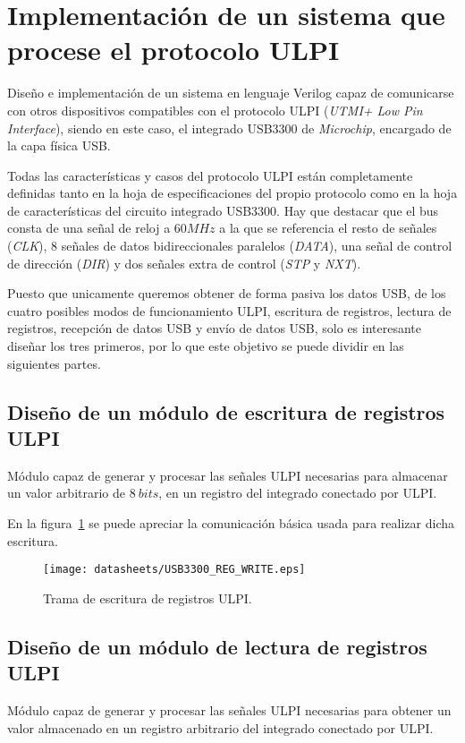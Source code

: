 \section{Implementación de un sistema que procese el protocolo ULPI}
Diseño e implementación de un sistema en lenguaje Verilog capaz de comunicarse con otros dispositivos compatibles con el protocolo ULPI (\emph{UTMI+ Low Pin Interface}), siendo en este caso, el integrado USB3300 de \emph{Microchip}, encargado de la capa física USB.

Todas las características y casos del protocolo ULPI están completamente definidas tanto en la hoja de especificaciones del propio protocolo\cite{ulpi-specs} como en la hoja de características del circuito integrado USB3300\cite{microchip:usb3300}. Hay que destacar que el bus consta de una señal de reloj a $60MHz$ a la que se referencia el resto de señales (\emph{CLK}), 8 señales de datos bidireccionales paralelos (\emph{DATA}), una señal de control de dirección (\emph{DIR}) y dos señales extra de control (\emph{STP} y \emph{NXT}).

Puesto que unicamente queremos obtener de forma pasiva los datos USB, de los cuatro posibles modos de funcionamiento ULPI, escritura de registros, lectura de registros, recepción de datos USB y envío de datos USB, solo es interesante diseñar los tres primeros, por lo que este objetivo se puede dividir en las siguientes partes.

\subsection{Diseño de un módulo de escritura de registros ULPI}
Módulo capaz de generar y procesar las señales ULPI necesarias para almacenar un valor arbitrario de $8~bits$, en un registro del integrado conectado por ULPI.

En la figura~\ref{fig:ULPI_REG_WRITE} se puede apreciar la comunicación básica usada para realizar dicha escritura.
\begin{figure}[hbt]
    \centering
    \texttt{[image: datasheets/USB3300\_REG\_WRITE.eps]}
    \caption{Trama de escritura de registros ULPI.}
    \label{fig:ULPI_REG_WRITE}
\end{figure}

\subsection{Diseño de un módulo de lectura de registros ULPI}
Módulo capaz de generar y procesar las señales ULPI necesarias para obtener un valor almacenado en un registro arbitrario del integrado conectado por ULPI.

